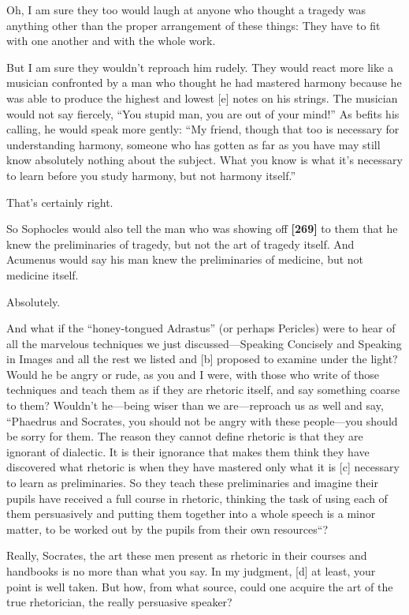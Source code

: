 \sayphaedrus Oh, I am sure they too would laugh at anyone who thought a
tragedy was anything other than the proper arrangement of these things:
They have to fit with one another and with the whole work.

\saysocrates But I am sure they wouldn't reproach him rudely. They would
react more like a musician confronted by a man who thought he had
mastered harmony because he was able to produce the highest and lowest
{[}e{]} notes on his strings. The musician would not say fiercely, “You
stupid man, you are out of your mind!” As befits his calling, he would
speak more gently: “My friend, though that too is necessary for
understanding harmony, someone who has gotten as far as you have may
still know absolutely nothing about the subject. What you know is what
it's necessary to learn before you study harmony, but not harmony
itself.”

\sayphaedrus That's certainly right.

\saysocrates So Sophocles would also tell the man who was showing off
{\bf {[}269{]}} to them that he knew the preliminaries of tragedy, but
not the art of tragedy itself. And Acumenus would say his man knew the
preliminaries of medicine, but not medicine itself.

\sayphaedrus Absolutely.

\saysocrates And what if the “honey-tongued Adrastus” (or perhaps
Pericles) were to hear
of all the marvelous techniques we just discussed---Speaking Concisely
and Speaking in Images and all the rest we listed and {[}b{]} proposed
to examine under the light? Would he be angry or rude, as you and I
were, with those who write of those techniques and teach them as if they
are rhetoric itself, and say something coarse to them? Wouldn't
he---being wiser than we are---reproach us as well and say, “Phaedrus
and Socrates, you should not be angry with these people---you should be
sorry for them. The reason they cannot define rhetoric is that they are
ignorant of dialectic. It is their ignorance that makes them think they
have discovered what rhetoric is when they have mastered only what it is
{[}c{]} necessary to learn as preliminaries. So they teach these
preliminaries and imagine their pupils have received a full course in
rhetoric, thinking the task of using each of them persuasively and
putting them together into a whole speech is a minor matter, to be
worked out by the pupils from their own resources“?

\sayphaedrus Really, Socrates, the art these men present as rhetoric in
their courses and handbooks is no more than what you say. In my
judgment, {[}d{]} at least, your point is well taken. But how, from what
source, could one acquire the art of the true rhetorician, the really
persuasive speaker?

